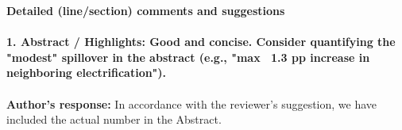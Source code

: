 \documentclass[11pt]{article}
\begin{document}
\newpage
\color{reviewergrey}
\textbf{Detailed (line/section) comments and suggestions} \\ \\
\textbf{1. Abstract / Highlights: Good and concise. Consider quantifying the "modest" spillover in the abstract (e.g., "max ~1.3 pp increase in neighboring electrification").}\\ \\
\color{authorblue}
\noindent \textcolor{authorblue}{\textbf{Author's response:}} In accordance with the reviewer's suggestion, we have included the actual number in the Abstract. \\\\
\color{reviewergrey}
\end{document}
